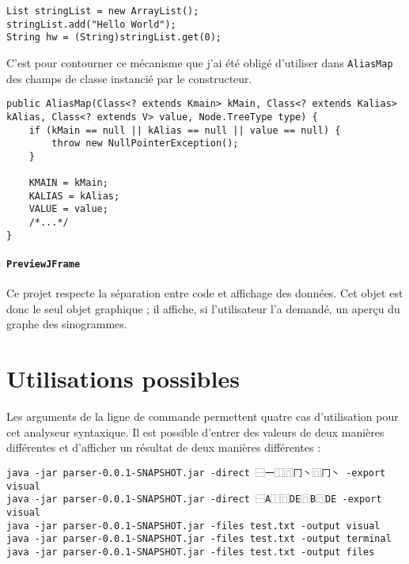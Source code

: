 \documentclass[12pt,onecolumn]{article}
\begin{document}
\begin{lstlisting}[caption={Code équivalent tel qu'écrit dans les fichiers \texttt{*.class} (ou avant 1.5)}]
List stringList = new ArrayList();
stringList.add("Hello World");
String hw = (String)stringList.get(0);
\end{lstlisting}

C'est pour contourner ce mécanisme que j'ai été obligé d'utiliser dans \texttt{AliasMap} des champs de classe instancié par le constructeur.
\begin{lstlisting}[caption={Constructeur d'un objet faussement générique}]
public AliasMap(Class<? extends Kmain> kMain, Class<? extends Kalias> kAlias, Class<? extends V> value, Node.TreeType type) {
	if (kMain == null || kAlias == null || value == null) {
		throw new NullPointerException();
	}

	KMAIN = kMain;
	KALIAS = kAlias;
	VALUE = value;
	/*...*/
}
\end{lstlisting}

\paragraph{\texttt{PreviewJFrame}} Ce projet respecte la séparation entre code et affichage des données. Cet objet est donc le seul objet graphique ; il affiche, si l'utilisateur l'a demandé, un aperçu du graphe des sinogrammes.

\section{Utilisations possibles}

Les arguments de la ligne de commande permettent quatre cas d'utilisation pour cet analyseur syntaxique. Il est possible d'entrer des valeurs de deux manières différentes et d'afficher un résultat de deux manières différentes :

\begin{lstlisting}[caption={Différentes manières d'utiliser l'exécutable de ce projet}]
java -jar parser-0.0.1-SNAPSHOT.jar -direct ⿱一⿰⿵冂丶⿵冂丶 -export visual
java -jar parser-0.0.1-SNAPSHOT.jar -direct ⿱A⿰⿵DE⿵B⿵DE -export visual
java -jar parser-0.0.1-SNAPSHOT.jar -files test.txt -output visual
java -jar parser-0.0.1-SNAPSHOT.jar -files test.txt -output terminal
java -jar parser-0.0.1-SNAPSHOT.jar -files test.txt -output files
\end{lstlisting}
\end{document}
